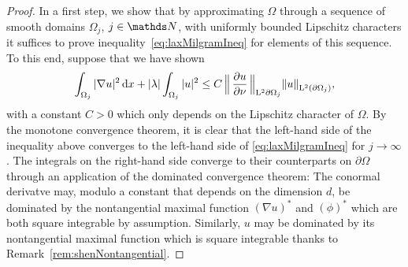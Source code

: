 \begin{proof}
  In a first step, we show that by approximating $\Omega$ through a sequence of smooth domains $\Omega_j$, $j \in \N$, with uniformly bounded Lipschitz characters it suffices to prove inequality~\eqref{eq:laxMilgramIneq} for elements of this sequence.
  To this end, suppose that we have shown 
  \begin{align*}
    \int_{\Omega_j} |\nabla u|^2 \, {\operatorname{d}\!{x}} + |\lambda| \int_{\Omega_j} |u|^2 \leq C \,\Big\|\, \frac{\partial u}{\partial \nu} \, \Big\|^{}_{\mathrm{L}^2{\partial\Omega_j}}  \|u\|^{}_{\mathrm{L}^2(\partial\Omega_j)},
  \end{align*}
  with a constant $C > 0$ which only depends on the Lipschitz character of $\Omega$.
  By the monotone convergence theorem, it is clear that the left-hand side of the inequality above converges to the left-hand side of \eqref{eq:laxMilgramIneq} for $j \to \infty$.
  The integrals on the right-hand side converge to their counterparts on $\partial\Omega$ through an application of the dominated convergence theorem: The conormal derivatve may, modulo a constant that depends on the dimension $d$, be dominated by the nontangential maximal function $(\nabla u)^*$ and $(\phi)^*$ which are both square integrable by assumption.
  Similarly, $u$ may be dominated by its nontangential maximal function which is square integrable thanks to Remark~\ref{rem:shenNontangential}.


\end{proof}
